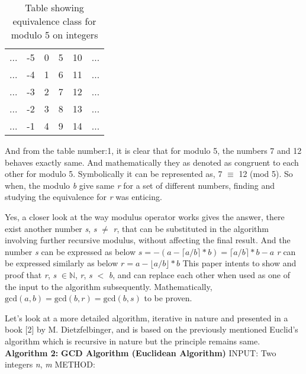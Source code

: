 \documentclass[conference]{IEEEtran}
\newcommand{\N}{{\mathbb N}}
\newcommand{\var}[1]{\textit{#1}}
\renewcommand{\gcd}{\text{gcd}}
\newcommand{\ceil}[1]{\lceil#1\rceil}
\newcommand{\floor}[1]{\lfloor#1\rfloor}
\begin{document}
\begin{table}[!htbp]
\renewcommand{\arraystretch}{1.3}
\caption{Table showing equivalence class for modulo 5 on integers}
\label{table:1}
\centering
	\begin{tabular}{c c c c c c}
		... & -5 & 0 & 5 & 10 & ... \\
		... & -4 & 1 & 6 & 11 & ... \\
		... & -3 & 2 & 7 & 12 & ... \\
		... & -2 & 3 & 8 & 13 & ... \\
		... & -1 & 4 & 9 & 14 & ...
	\end{tabular}
\end{table}

And from the table number:1, it is clear that for modulo 5, the numbers 7 and 12 behaves exactly same. And mathematically they as denoted as congruent to each other for modulo 5.
Symbolically it can be represented as, 7 $\equiv$ 12 (mod 5).
So when, the modulo \var{b} give same \var{r} for a set of different numbers, finding and studying the equivalence for \var{r} was enticing.

Yes, a closer look at the way modulus operator works gives the answer, there exist another  number \var{s}, \var{s} $\neq$ \var{r}, that can be substituted in the algorithm involving further recursive modulus, without affecting the final result. And the number \textit{s} can be expressed as below
\newline $s = -(a-\ceil{a/b}*b) = \ceil{a/b}*b - a$
\newline \textit{r} can be expressed similarly as below
\newline $r = a - \floor{a/b}*b$
\newline This paper intents to show and proof that \textit{r}, \textit{s} $\in \N$, \textit{r}, \textit{s} $<$ \textit{b}, and can replace each other when used as one of the input to the algorithm subsequently. Mathematically, $\gcd(a,b) =\gcd(b,r) = \gcd(b,s)$ to be proven.


Let's look at a more detailed algorithm, iterative in nature and presented in a book [2] by M. Dietzfelbinger, and is based on the previously mentioned Euclid's algorithm which is recursive in nature but the principle remains same.
\newline
\newline \textbf{Algorithm 2:}
\newline \textbf{GCD Algorithm (Euclidean Algorithm)}
\newline INPUT: Two integers \var{n}, \var{m}
\newline METHOD:
\end{document}

